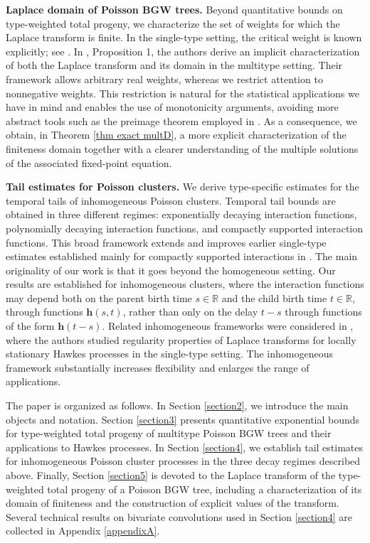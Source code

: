 \documentclass[reqno,final,11pt]{amsart}
\renewcommand{\cite}{\citet}
\theoremstyle{plain}
\theoremstyle{definition}
\theoremstyle{remark}
\newcommand{\R}{\mathds{R}}
\newcommand{\h}{\bm{h}}
\begin{document}
\textbf{Laplace domain of Poisson BGW trees.}
Beyond quantitative bounds on type-weighted total progeny, we characterize the set of weights for which the Laplace transform is finite. In the single-type setting, the critical weight is known explicitly; see \cite{bordenave_large_2007}. In \cite{karim_compound_2025}, Proposition 1, the authors derive an implicit characterization of both the Laplace transform and its domain in the multitype setting. Their framework allows arbitrary real weights, whereas we restrict attention to nonnegative weights. This restriction is natural for the statistical applications we have in mind and enables the use of monotonicity arguments, avoiding more abstract tools such as the preimage theorem employed in \cite{karim_compound_2025}. As a consequence, we obtain, in Theorem \ref{thm exact multD}, a more explicit characterization of the finiteness domain together with a clearer understanding of the multiple solutions of the associated fixed-point equation.

\textbf{Tail estimates for Poisson clusters.}
We derive type-specific estimates for the temporal tails of inhomogeneous Poisson clusters. Temporal tail bounds are obtained in three different regimes: exponentially decaying interaction functions, polynomially decaying interaction functions, and compactly supported interaction functions. This broad framework extends and improves earlier single-type estimates established mainly for compactly supported interactions in \cite{reynaud-bouret_non_2007}. The main originality of our work is that it goes beyond the homogeneous setting. Our results are established for inhomogeneous clusters, where the interaction functions may depend both on the parent birth time $s \in \R$ and the child birth time $t \in \R$, through functions $\h(s,t)$, rather than only on the delay $t-s$ through functions of the form $\h(t-s)$. Related inhomogeneous frameworks were considered in \cite{roueff_locally_2016}, where the authors studied regularity properties of Laplace transforms for locally stationary Hawkes processes in the single-type setting. The inhomogeneous framework substantially increases flexibility and enlarges the range of applications.

The paper is organized as follows. In Section \ref{section2}, we introduce the main objects and notation. Section \ref{section3} presents quantitative exponential bounds for type-weighted total progeny of multitype Poisson BGW trees and their applications to Hawkes processes. In Section \ref{section4}, we establish tail estimates for inhomogeneous Poisson cluster processes in the three decay regimes described above. Finally, Section \ref{section5} is devoted to the Laplace transform of the type-weighted total progeny of a Poisson BGW tree, including a characterization of its domain of finiteness and the construction of explicit values of the transform. Several technical results on bivariate convolutions used in Section \ref{section4} are collected in Appendix \ref{appendixA}.
\end{document}
